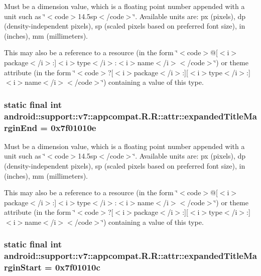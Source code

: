 Must be a dimension value, which is a floating point number appended with a unit such as \char`\"{}$<$code$>$14.5sp$<$/code$>$\char`\"{}. Available units are: px (pixels), dp (density-independent pixels), sp (scaled pixels based on preferred font size), in (inches), mm (millimeters). 

This may also be a reference to a resource (in the form \char`\"{}$<$code$>$@\mbox{[}$<$i$>$package$<$/i$>$:\mbox{]}$<$i$>$type$<$/i$>$:$<$i$>$name$<$/i$>$$<$/code$>$\char`\"{}) or theme attribute (in the form \char`\"{}$<$code$>$?\mbox{[}$<$i$>$package$<$/i$>$:\mbox{]}\mbox{[}$<$i$>$type$<$/i$>$:\mbox{]}$<$i$>$name$<$/i$>$$<$/code$>$\char`\"{}) containing a value of this type. \hypertarget{classandroid_1_1support_1_1v7_1_1appcompat_1_1_r_1_1attr_c558bd3fec395c8cae76d1be72dcd3eb}{
\subsubsection[{expandedTitleMarginEnd}]{\setlength{\rightskip}{0pt plus 5cm}static final int android::support::v7::appcompat.R.R::attr::expandedTitleMarginEnd = 0x7f01010e}}
\label{classandroid_1_1support_1_1v7_1_1appcompat_1_1_r_1_1attr_c558bd3fec395c8cae76d1be72dcd3eb}


Must be a dimension value, which is a floating point number appended with a unit such as \char`\"{}$<$code$>$14.5sp$<$/code$>$\char`\"{}. Available units are: px (pixels), dp (density-independent pixels), sp (scaled pixels based on preferred font size), in (inches), mm (millimeters). 

This may also be a reference to a resource (in the form \char`\"{}$<$code$>$@\mbox{[}$<$i$>$package$<$/i$>$:\mbox{]}$<$i$>$type$<$/i$>$:$<$i$>$name$<$/i$>$$<$/code$>$\char`\"{}) or theme attribute (in the form \char`\"{}$<$code$>$?\mbox{[}$<$i$>$package$<$/i$>$:\mbox{]}\mbox{[}$<$i$>$type$<$/i$>$:\mbox{]}$<$i$>$name$<$/i$>$$<$/code$>$\char`\"{}) containing a value of this type. \hypertarget{classandroid_1_1support_1_1v7_1_1appcompat_1_1_r_1_1attr_2472836b522ff436d8f596b7e856f2e9}{
\subsubsection[{expandedTitleMarginStart}]{\setlength{\rightskip}{0pt plus 5cm}static final int android::support::v7::appcompat.R.R::attr::expandedTitleMarginStart = 0x7f01010c}}
\label{classandroid_1_1support_1_1v7_1_1appcompat_1_1_r_1_1attr_2472836b522ff436d8f596b7e856f2e9}


